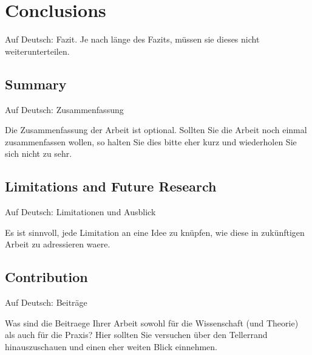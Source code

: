 \chapter{Conclusions}\label{chap:conclusions}

Auf Deutsch: Fazit. Je nach länge des Fazits, müssen sie dieses nicht weiterunterteilen.

\section{Summary}

Auf Deutsch: Zusammenfassung 

Die Zusammenfassung der Arbeit ist optional. Sollten Sie die Arbeit noch einmal zusammenfassen wollen, so halten Sie dies bitte eher kurz und wiederholen Sie sich nicht zu sehr.

\section{Limitations and Future Research}

Auf Deutsch: Limitationen und Ausblick

Es ist sinnvoll, jede Limitation an eine Idee zu knüpfen, wie diese in zukünftigen Arbeit zu adressieren waere.

\section{Contribution}

Auf Deutsch: Beiträge

Was sind die Beitraege Ihrer Arbeit sowohl für die Wissenschaft (und Theorie) als auch für die Praxis? Hier sollten Sie versuchen über den Tellerrand hinauszuschauen und einen eher weiten Blick einnehmen.




